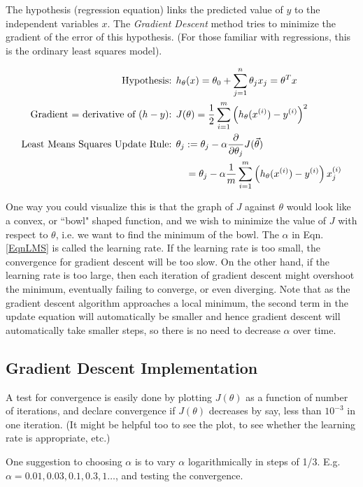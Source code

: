 \documentclass[letterpaper,10pt]{article}
\begin{document}
The hypothesis (regression equation) links the predicted value of $y$ to the independent variables $x$. The \textit{Gradient Descent} method tries to minimize the gradient of the error of this hypothesis. (For those familiar with regressions, this is the ordinary least squares model).

\begin{align}
\text{Hypothesis: }& h_\theta (x) = \theta_0 + \sum_{j=1}^n \theta_j x_j = \theta^T x\\
\text{Gradient = derivative of }(h-y)\text{: }& J(\theta)=\frac{1}{2} \sum_{i=1}^m \left( h_{\theta}(x^{(i)}) - y^{(i)}  \right)^2 \\
\text{Least Means Squares Update Rule: }& \theta_j := \theta_j - \alpha \frac{\partial}{\partial \theta_j} J(\vec \theta) \label{EqnLMS} \\
&\quad = \theta_j - \alpha \frac{1}{m} \sum_{i=1}^m \left( h_{\theta}(x^{(i)}) - y^{(i)}  \right) x_j^{(i)} \notag
\end{align}

One way you could visualize this is that the graph of $J$ against $\theta$ would look like a convex, or ``bowl" shaped function, and we wish to minimize the value of $J$ with respect to $\theta$, i.e. we want to find the minimum of the bowl. The $\alpha$ in Eqn. \ref{EqnLMS} is called the learning rate. If the learning rate is too small, the convergence for gradient descent will be too slow. On the other hand, if the learning rate is too large, then each iteration of gradient descent might overshoot the minimum, eventually failing to converge, or even diverging. Note that as the gradient descent algorithm approaches a local minimum, the second term in the update equation will automatically be smaller and hence gradient descent will automatically take smaller steps, so there is no need to decrease $\alpha$ over time.


\subsection{Gradient Descent Implementation}

A test for convergence is easily done by plotting $J(\theta)$ as a function of number of iterations, and declare convergence if $J(\theta)$ decreases by say, less than $10^{-3}$ in one iteration. (It might be helpful too to see the plot, to see whether the learning rate is appropriate, etc.)

One suggestion to choosing $\alpha$ is to vary $\alpha$ logarithmically in steps of 1/3. E.g. $\alpha = 0.01, 0.03, 0.1, 0.3, 1 \ldots$, and testing the convergence.
\end{document}
